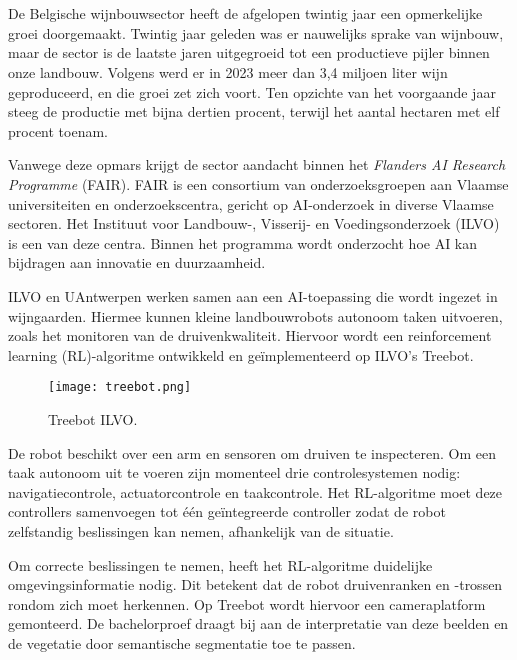 
\chapter{}%
\label{ch:inleiding}

De Belgische wijnbouwsector heeft de afgelopen twintig jaar een opmerkelijke groei doorgemaakt.  Twintig jaar geleden was er nauwelijks sprake van wijnbouw, maar de sector is de laatste jaren uitgegroeid tot een productieve pijler binnen onze landbouw. Volgens \textcite{FODEconomie2024} werd er in 2023 meer dan 3,4 miljoen liter wijn geproduceerd, en die groei zet zich voort. Ten opzichte van het voorgaande jaar steeg de productie met bijna dertien procent, terwijl het aantal hectaren met elf procent toenam. 

Vanwege deze opmars krijgt de sector aandacht binnen het \textit{Flanders AI Research Programme} (FAIR). FAIR is een consortium van onderzoeksgroepen aan Vlaamse universiteiten en onderzoekscentra, gericht op AI-onderzoek in diverse Vlaamse sectoren. Het Instituut voor Landbouw-, Visserij- en Voedingsonderzoek (ILVO) is een van deze centra. Binnen het programma wordt onderzocht hoe AI kan bijdragen aan innovatie en duurzaamheid.

ILVO en UAntwerpen werken samen aan een AI-toepassing die wordt ingezet in wijngaarden. Hiermee kunnen kleine landbouwrobots autonoom taken uitvoeren, zoals het monitoren van de druivenkwaliteit. Hiervoor wordt een reinforcement learning (RL)-algoritme ontwikkeld en geïmplementeerd op ILVO's Treebot. \begin{figure}
    \centering
    \texttt{[image: treebot.png]}
    \caption[Treebot ILVO.]{\label{fig:treebot}Treebot ILVO.}
\end{figure}

De robot beschikt over een arm en sensoren om druiven te inspecteren. Om een taak autonoom uit te voeren zijn momenteel drie controlesystemen nodig: navigatiecontrole, actuatorcontrole en taakcontrole. Het RL-algoritme moet deze controllers samenvoegen tot één geïntegreerde controller zodat de robot zelfstandig beslissingen kan nemen, afhankelijk van de situatie.

Om correcte beslissingen te nemen, heeft het RL-algoritme duidelijke omgevingsinformatie nodig. Dit betekent dat de robot druivenranken en -trossen rondom zich moet herkennen. Op Treebot wordt hiervoor een cameraplatform gemonteerd. De bachelorproef draagt bij aan de interpretatie van deze beelden en de vegetatie door semantische segmentatie toe te passen.

